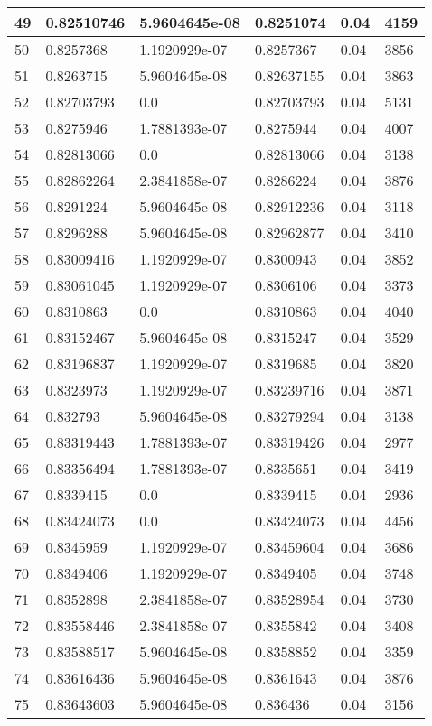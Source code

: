 \begin{longtable}{|l|l|l|l|l|l|}
49 & 0.82510746 & 5.9604645e-08 & 0.8251074 & 0.04 & 4159 \\ \hline 
50 & 0.8257368 & 1.1920929e-07 & 0.8257367 & 0.04 & 3856 \\ \hline 
51 & 0.8263715 & 5.9604645e-08 & 0.82637155 & 0.04 & 3863 \\ \hline 
52 & 0.82703793 & 0.0 & 0.82703793 & 0.04 & 5131 \\ \hline 
53 & 0.8275946 & 1.7881393e-07 & 0.8275944 & 0.04 & 4007 \\ \hline 
54 & 0.82813066 & 0.0 & 0.82813066 & 0.04 & 3138 \\ \hline 
55 & 0.82862264 & 2.3841858e-07 & 0.8286224 & 0.04 & 3876 \\ \hline 
56 & 0.8291224 & 5.9604645e-08 & 0.82912236 & 0.04 & 3118 \\ \hline 
57 & 0.8296288 & 5.9604645e-08 & 0.82962877 & 0.04 & 3410 \\ \hline 
58 & 0.83009416 & 1.1920929e-07 & 0.8300943 & 0.04 & 3852 \\ \hline 
59 & 0.83061045 & 1.1920929e-07 & 0.8306106 & 0.04 & 3373 \\ \hline 
60 & 0.8310863 & 0.0 & 0.8310863 & 0.04 & 4040 \\ \hline 
61 & 0.83152467 & 5.9604645e-08 & 0.8315247 & 0.04 & 3529 \\ \hline 
62 & 0.83196837 & 1.1920929e-07 & 0.8319685 & 0.04 & 3820 \\ \hline 
63 & 0.8323973 & 1.1920929e-07 & 0.83239716 & 0.04 & 3871 \\ \hline 
64 & 0.832793 & 5.9604645e-08 & 0.83279294 & 0.04 & 3138 \\ \hline 
65 & 0.83319443 & 1.7881393e-07 & 0.83319426 & 0.04 & 2977 \\ \hline 
66 & 0.83356494 & 1.7881393e-07 & 0.8335651 & 0.04 & 3419 \\ \hline 
67 & 0.8339415 & 0.0 & 0.8339415 & 0.04 & 2936 \\ \hline 
68 & 0.83424073 & 0.0 & 0.83424073 & 0.04 & 4456 \\ \hline 
69 & 0.8345959 & 1.1920929e-07 & 0.83459604 & 0.04 & 3686 \\ \hline 
70 & 0.8349406 & 1.1920929e-07 & 0.8349405 & 0.04 & 3748 \\ \hline 
71 & 0.8352898 & 2.3841858e-07 & 0.83528954 & 0.04 & 3730 \\ \hline 
72 & 0.83558446 & 2.3841858e-07 & 0.8355842 & 0.04 & 3408 \\ \hline 
73 & 0.83588517 & 5.9604645e-08 & 0.8358852 & 0.04 & 3359 \\ \hline 
74 & 0.83616436 & 5.9604645e-08 & 0.8361643 & 0.04 & 3876 \\ \hline 
75 & 0.83643603 & 5.9604645e-08 & 0.836436 & 0.04 & 3156 \\ \hline 
\end{longtable}